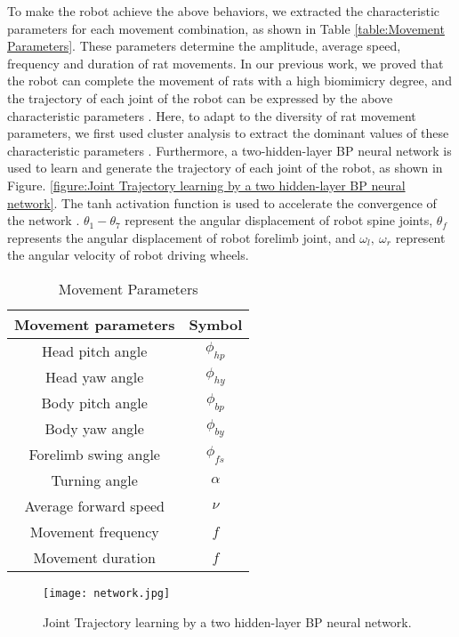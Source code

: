 To make the robot achieve the above behaviors, we extracted the characteristic
parameters for each movement combination, as shown in Table \ref{table:Movement
Parameters}. These parameters determine the amplitude, average speed, frequency
and duration of rat movements. In our previous work, we proved that the robot
can complete the movement of rats with a high biomimicry degree, and the
trajectory of each joint of the robot can be expressed by the above
characteristic parameters \cite{shi-gao-tro-2021}. Here, to adapt to the
diversity of rat movement parameters, we first used cluster analysis to extract
the dominant values of these characteristic parameters
\cite{fraley_how_many_clusters,kaufman_finding_groups}. Furthermore, a
two-hidden-layer BP neural network is used to learn and generate the trajectory
of each joint of the robot, as shown in Figure. \ref{figure:Joint Trajectory
learning by a two hidden-layer BP neural network}. The tanh activation function
is used to accelerate the convergence of the network
\cite{inohira-generalization}. $\theta_1-\theta_7$ represent the angular
displacement of robot spine joints, $\theta_f$ represents the angular
displacement of robot forelimb joint, and $\omega_l,~\omega_r$ represent the
angular velocity of robot driving wheels.

\begin{table}[b]
    \caption{Movement Parameters}
    \centering
    \begin{tabular}{cc}
            \hline
            Movement parameters & Symbol \\
            \hline
            Head pitch angle & $\phi_{hp}$ \\
            Head yaw angle & $\phi_{hy}$ \\
            Body pitch angle & $\phi_{bp}$ \\
            Body yaw angle & $\phi_{by}$ \\
            Forelimb swing angle & $\phi_{fs}$ \\
            Turning angle & $\alpha$ \\
            Average forward speed & $\nu$ \\
            Movement frequency & $f$ \\
            Movement duration & $f$ \\
            \hline
            \end{tabular}
    \label{table:Movement Parameters}
\end{table}

\begin{figure}[h]
    \centering
    \texttt{[image: network.jpg]}
    \caption{Joint Trajectory learning by a two hidden-layer BP neural network.}
    \label{figure:Joint Trajectory learning by a two hidden-layer BP neural
    network}
\end{figure}

